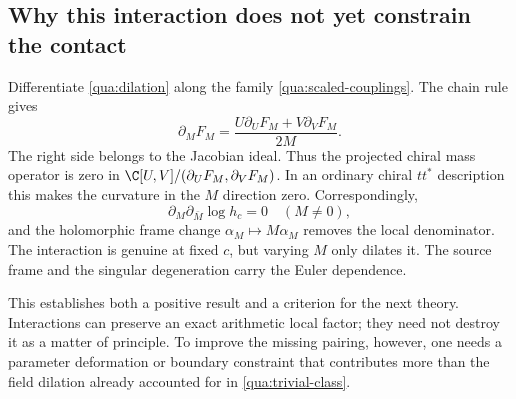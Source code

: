 \subsection{Why this interaction does not yet constrain the contact}
Differentiate \eqref{qua:dilation} along the family \eqref{qua:scaled-couplings}. The chain rule gives
\begin{equation}\label{qua:trivial-class}
\partial_M F_M=\frac{U\partial_UF_M+V\partial_VF_M}{2M}.
\end{equation}
The right side belongs to the Jacobian ideal. Thus the projected chiral mass operator is zero in
$\C[U,V]/(\partial_UF_M,\partial_VF_M)$. In an ordinary chiral $tt^*$ description this makes the curvature in the $M$ direction zero. Correspondingly,
\[
\partial_M\partial_{\bar M}\log h_c=0\quad(M\ne0),
\]
and the holomorphic frame change $\alpha_M\mapsto M\alpha_M$ removes the local denominator. The interaction is genuine at fixed $c$, but varying $M$ only dilates it. The source frame and the singular degeneration carry the Euler dependence.

This establishes both a positive result and a criterion for the next theory. Interactions can preserve an exact arithmetic local factor; they need not destroy it as a matter of principle. To improve the missing pairing, however, one needs a parameter deformation or boundary constraint that contributes more than the field dilation already accounted for in \eqref{qua:trivial-class}.
